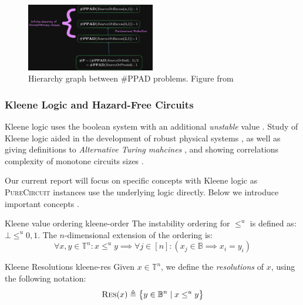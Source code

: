 \begin{figure}[h!]
    \centering
    \includegraphics[width=0.5\textwidth]{assets/chart-plot.png}
    \caption{Hierarchy graph between \textsc{\#PPAD} problems. Figure from \cite{ikenmeyer_WhatWhatNot_2022}}\label{fig:ppad-count-hier}
\end{figure}


\subsubsection{Kleene Logic and Hazard-Free Circuits}

Kleene logic uses the boolean system with an additional \textit{unstable} value \cite{kleene_IntroductionMetamathematics_2009}. 
Study of Kleene logic aided in
the development of robust physical systems \cite{friedrichs_MetastabilityContainingCircuits_2018}, as well as
giving definitions to \textit{Alternative Turing mahcines} \cite{kozen_TheoryComputation_2006}, and
showing correlations complexity of monotone circuits sizes
\cite{eichelberger_HazardDetectionCombinational_1965, ikenmeyer_ComplexityHazardfreeCircuits_2019,ikenmeyer_KarchmerWigdersonGamesHazardfree_2022,  bund_SmallHazardFreeTransducers_2025}. 

Our current report will focus on specific concepts with Kleene logic as \textsc{PureCircuit} instances
use the underlying logic directly. Below we introduce important concepts \cite{mukaidono_BternaryLogicFunction_1972}.

\begin{definitionbox}{Kleene value ordering \cite{mukaidono_BternaryLogicFunction_1972}}{kleene-order}
    The instability ordering for $\leq^u$ is defined as: $\bot \leq^u 0,1$. The $n$-dimensional
    extension of the ordering is:
    $$
    \forall x,y \in \mathbb{T}^n: x \leq^u y \implies \forall j \in [n]: (x_j \in \mathbb{B} \implies x_i = y_i)
    $$
\end{definitionbox}


\begin{definitionbox}{Kleene Resolutions \cite{mukaidono_BternaryLogicFunction_1972, ikenmeyer_ComplexityHazardfreeCircuits_2019}}{kleene-res}
    Given $x \in \mathbb{T}^n$, we define the \textit{resolutions} of $x$, using the following notation:
    $$
    \textnormal{\textsc{Res}}(x) \triangleq \big\{ y \in \mathbb{B}^n \mid x \leq^u y  \big\}
    $$
\end{definitionbox}

